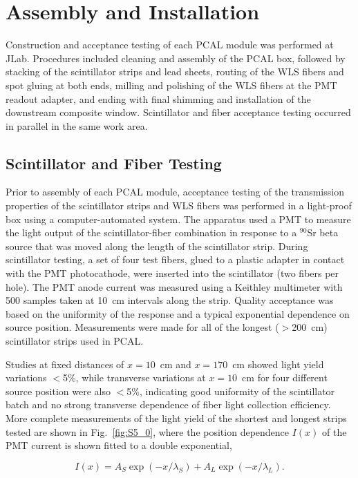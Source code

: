 \section{Assembly and Installation}

Construction and acceptance testing of each PCAL module was performed at JLab. Procedures included cleaning
and assembly of the PCAL box, followed by stacking of the scintillator strips and lead sheets, routing of the WLS
fibers and spot gluing at both ends, milling and polishing of the WLS fibers at the PMT readout adapter, and
ending with final shimming and installation of the downstream composite window. Scintillator and fiber acceptance
testing occurred in parallel in the same work area.

\subsection{Scintillator and Fiber Testing}

Prior to assembly of each PCAL module, acceptance testing of the transmission properties of the scintillator strips
and WLS fibers was performed in a light-proof box using a computer-automated system. The apparatus used a
PMT to measure the light output of the scintillator-fiber combination in response to a $^{90}$Sr beta source that
was moved along the length of the scintillator strip. During scintillator testing, a set of four test fibers, glued to a
plastic adapter in contact with the PMT photocathode, were inserted into the scintillator (two fibers per hole).
The PMT anode current was measured using a Keithley multimeter with 500 samples taken at 10~cm intervals along
the strip. Quality acceptance was based on the uniformity of the response and a typical exponential dependence on
source position. Measurements were made for all of the longest ($>$200~cm) scintillator strips used in PCAL.

Studies at fixed distances of $x=10$~cm and $x=170$~cm showed light yield variations $<$5\%, while transverse
variations at $x=10$~cm for four different source position were also $<$5\%, indicating good uniformity of the
scintillator batch and no strong transverse dependence of fiber light collection efficiency. More complete
measurements of the light yield of the shortest and longest strips tested are shown in Fig.~\ref{fig:S5_0}, where
the position dependence $I(x)$ of the PMT current is shown fitted to a double exponential,

\begin{equation}
I(x) = A_S \exp(-x/\lambda_S)+A_L \exp(-x/\lambda_L).
\end{equation}

